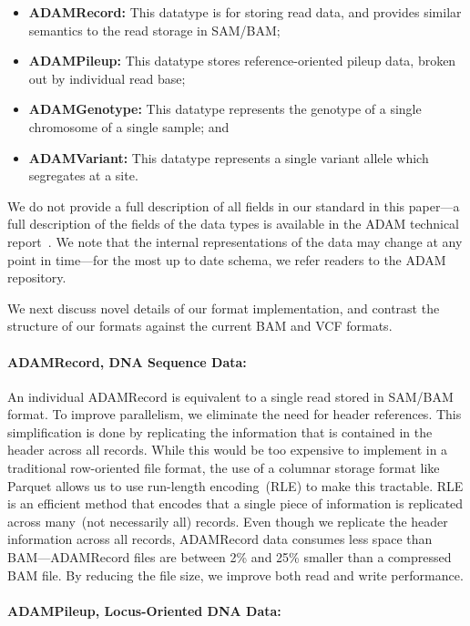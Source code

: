 \documentclass{bioinfo}
\begin{document}
\begin{itemize}
\item \textbf{ADAMRecord:} This datatype is for storing read data, and provides similar semantics to the read storage in SAM/BAM;
\item \textbf{ADAMPileup:} This datatype stores reference-oriented pileup data, broken out by individual read base;
\item \textbf{ADAMGenotype:} This datatype represents the genotype of a single chromosome of a single sample; and
\item \textbf{ADAMVariant:} This datatype represents a single variant allele which segregates at a site.
\end{itemize}

We do not provide a full description of all fields in our standard in this paper---a full description of the fields of the data types is available in the ADAM technical
report~\citep[see][\S5]{massie13}. We note that the internal representations of the data may change at any point in time---for the most up to date schema, we refer readers
to the ADAM repository.

We next discuss novel details of our format implementation, and contrast the structure of our formats against the current BAM and VCF formats. 

\paragraph{ADAMRecord, DNA Sequence Data:}
\label{sec:adamrecord}

An individual ADAMRecord is equivalent to a single read stored in SAM/BAM format. To improve parallelism, we eliminate the need for header references. This simplification
is done by replicating the information that is contained in the header across all records. While this would be too expensive to implement in a traditional row-oriented file format,
the use of a columnar storage format like Parquet allows us to use run-length encoding~(RLE) to make this tractable. RLE is an efficient method that encodes that a single piece
of information is replicated across many~(not necessarily all) records. Even though we replicate the header information across all records, ADAMRecord data consumes less
space than BAM---ADAMRecord files are between 2\% and 25\% smaller than a compressed BAM file. By reducing the file size, we improve both read and write performance.

\paragraph{ADAMPileup, Locus-Oriented DNA Data:}
\label{sec:adampileup}
\end{document}
